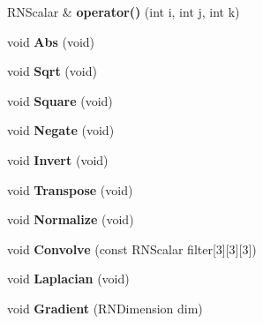 \begin{DoxyCompactItemize}
\item 
R\+N\+Scalar \& {\bfseries operator()} (int i, int j, int k)\hypertarget{class_r3_grid_acd5c37f10c4a9030c87c134c1c2e35bf}{}\label{class_r3_grid_acd5c37f10c4a9030c87c134c1c2e35bf}

\item 
void {\bfseries Abs} (void)\hypertarget{class_r3_grid_a39a47b010ee0a1010ae44b5509021f9e}{}\label{class_r3_grid_a39a47b010ee0a1010ae44b5509021f9e}

\item 
void {\bfseries Sqrt} (void)\hypertarget{class_r3_grid_afec9b5b5bfff61f34c0c63adf94d5e87}{}\label{class_r3_grid_afec9b5b5bfff61f34c0c63adf94d5e87}

\item 
void {\bfseries Square} (void)\hypertarget{class_r3_grid_aadef1b026fd93b3f23ec5f12e5a621b0}{}\label{class_r3_grid_aadef1b026fd93b3f23ec5f12e5a621b0}

\item 
void {\bfseries Negate} (void)\hypertarget{class_r3_grid_a2275b93c175ddd0678b5232fc4ad508a}{}\label{class_r3_grid_a2275b93c175ddd0678b5232fc4ad508a}

\item 
void {\bfseries Invert} (void)\hypertarget{class_r3_grid_a716a008023b16f52ed84567435bc4466}{}\label{class_r3_grid_a716a008023b16f52ed84567435bc4466}

\item 
void {\bfseries Transpose} (void)\hypertarget{class_r3_grid_ac073242feee587be9b481313be88c0f7}{}\label{class_r3_grid_ac073242feee587be9b481313be88c0f7}

\item 
void {\bfseries Normalize} (void)\hypertarget{class_r3_grid_a7445ecffaa255533fd8a6f0f214dab84}{}\label{class_r3_grid_a7445ecffaa255533fd8a6f0f214dab84}

\item 
void {\bfseries Convolve} (const R\+N\+Scalar filter\mbox{[}3\mbox{]}\mbox{[}3\mbox{]}\mbox{[}3\mbox{]})\hypertarget{class_r3_grid_a2c092da25929f56e0f751267d4d89b79}{}\label{class_r3_grid_a2c092da25929f56e0f751267d4d89b79}

\item 
void {\bfseries Laplacian} (void)\hypertarget{class_r3_grid_aee8f2a41426d97be49bca26b6e9300c6}{}\label{class_r3_grid_aee8f2a41426d97be49bca26b6e9300c6}

\item 
void {\bfseries Gradient} (R\+N\+Dimension dim)\hypertarget{class_r3_grid_a16295f56ac5bd7c8b7b40c01876e62ca}{}\label{class_r3_grid_a16295f56ac5bd7c8b7b40c01876e62ca}


\end{DoxyCompactItemize}

